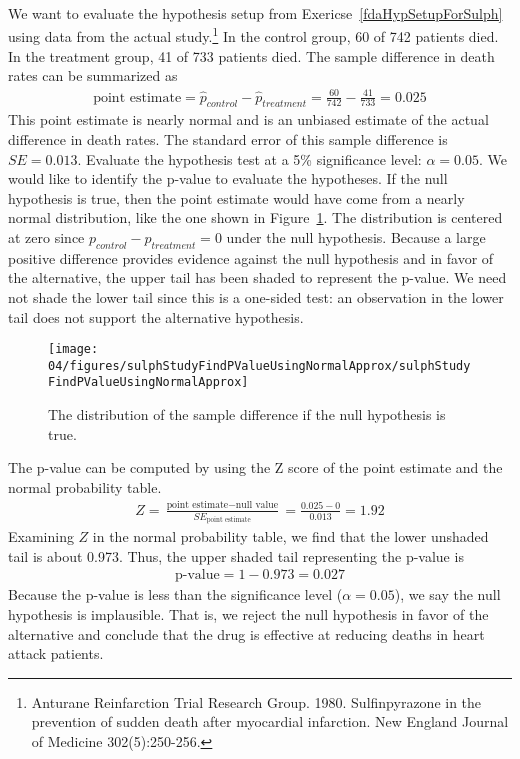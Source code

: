 {\begin{example}{We want to evaluate the hypothesis setup from Exericse~\ref{fdaHypSetupForSulph} using data from the actual study.\footnote{Anturane Reinfarction Trial Research Group. 1980. Sulfinpyrazone in the prevention of sudden death after myocardial infarction. New England Journal of Medicine 302(5):250-256.} In the control group, 60 of 742 patients died. In the treatment group, 41 of 733 patients died. The sample difference in death rates can be summarized as
\begin{eqnarray*}
\text{point estimate} = \hat{p}_{control} - \hat{p}_{treatment} = \frac{60}{742} - \frac{41}{733} = 0.025
\end{eqnarray*}
This point estimate is nearly normal and is an unbiased estimate of the actual difference in death rates. The standard error of this sample difference is $SE = 0.013$. Evaluate the hypothesis test at a 5\% significance level: $\alpha=0.05$.}
We would like to identify the p-value to evaluate the hypotheses. If the null hypothesis is true, then the point estimate would have come from a nearly normal distribution, like the one shown in Figure~\ref{sulphStudyFindPValueUsingNormalApprox}. The distribution is centered at zero since $p_{control}-p_{treatment}=0$ under the null hypothesis. Because a large positive difference provides evidence against the null hypothesis and in favor of the alternative, the upper tail has been shaded to represent the p-value. We need not shade the lower tail since this is a one-sided test: an observation in the lower tail does not support the alternative hypothesis.

\begin{figure}[bt]
   \centering
   \texttt{[image: 04/figures/sulphStudyFindPValueUsingNormalApprox/sulphStudyFindPValueUsingNormalApprox]}
   \caption{The distribution of the sample difference if the null hypothesis is true.}
   \label{sulphStudyFindPValueUsingNormalApprox}
\end{figure}

The p-value can be computed by using the Z score of the point estimate and the normal probability table.
\begin{eqnarray}
Z = \frac{\text{point estimate} - \text{null value}}{SE_{\text{point estimate}}}
	= \frac{0.025 - 0}{0.013} = 1.92
\label{zScoreOfPointEstimateForSulphinpyrazoneThisIsFirstTestStatReference}
\end{eqnarray}
Examining $Z$ in the normal probability table, we find that the lower unshaded tail is about 0.973. Thus, the upper shaded tail representing the p-value is
\begin{eqnarray*}
\text{p-value} = 1-0.973 = 0.027
\end{eqnarray*}
Because the p-value is less than the significance level ($\alpha=0.05$), we say the null hypothesis is implausible. That is, we reject the null hypothesis in favor of the alternative and conclude that the drug is effective at reducing deaths in heart attack patients.
\end{example}

}
